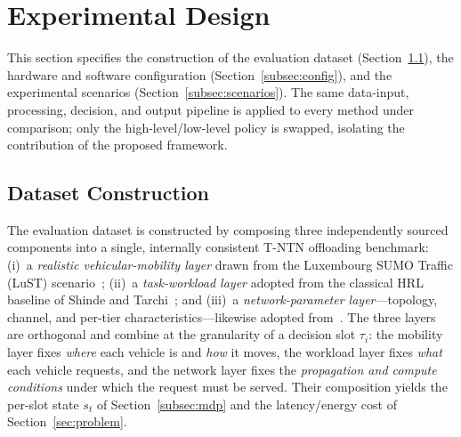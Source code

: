 \documentclass[11pt,a4paper]{article}
\theoremstyle{definition}
\begin{document}
\section{Experimental Design}
\label{sec:experimental}

This section specifies the construction of the evaluation dataset (Section~\ref{subsec:setup}), the hardware and software configuration (Section~\ref{subsec:config}), and the experimental scenarios (Section~\ref{subsec:scenarios}). The same data-input, processing, decision, and output pipeline is applied to every method under comparison; only the high-level/low-level policy is swapped, isolating the contribution of the proposed framework.

\subsection{Dataset Construction}
\label{subsec:setup}

The evaluation dataset is constructed by composing three independently sourced components into a single, internally consistent T-NTN offloading benchmark: (i)~a \emph{realistic vehicular-mobility layer} drawn from the Luxembourg SUMO Traffic (LuST) scenario~\cite{codeca2015lust}; (ii)~a \emph{task-workload layer} adopted from the classical HRL baseline of Shinde and Tarchi~\cite{hrl_ntn}; and (iii)~a \emph{network-parameter layer}---topology, channel, and per-tier characteristics---likewise adopted from~\cite{hrl_ntn}. The three layers are orthogonal and combine at the granularity of a decision slot $\tau_i$: the mobility layer fixes \emph{where} each vehicle is and \emph{how} it moves, the workload layer fixes \emph{what} each vehicle requests, and the network layer fixes the \emph{propagation and compute conditions} under which the request must be served. Their composition yields the per-slot state $s_t$ of Section~\ref{subsec:mdp} and the latency/energy cost of Section~\ref{sec:problem}.
\end{document}
